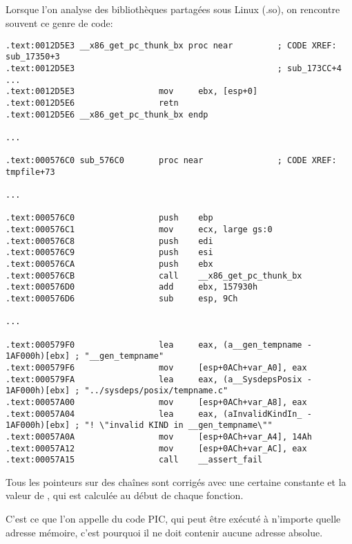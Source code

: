\subsection{\CapitalPICcode}
\myindex{\PICcode}
\label{sec:PIC}

Lorsque l'on analyse des bibliothèques partagées sous Linux (.so), on rencontre souvent
ce genre de code:

\begin{lstlisting}[caption=libc-2.17.so x86]
.text:0012D5E3 __x86_get_pc_thunk_bx proc near         ; CODE XREF: sub_17350+3
.text:0012D5E3                                         ; sub_173CC+4 ...
.text:0012D5E3                 mov     ebx, [esp+0]
.text:0012D5E6                 retn
.text:0012D5E6 __x86_get_pc_thunk_bx endp

...

.text:000576C0 sub_576C0       proc near               ; CODE XREF: tmpfile+73

...

.text:000576C0                 push    ebp
.text:000576C1                 mov     ecx, large gs:0
.text:000576C8                 push    edi
.text:000576C9                 push    esi
.text:000576CA                 push    ebx
.text:000576CB                 call    __x86_get_pc_thunk_bx
.text:000576D0                 add     ebx, 157930h
.text:000576D6                 sub     esp, 9Ch

...

.text:000579F0                 lea     eax, (a__gen_tempname - 1AF000h)[ebx] ; "__gen_tempname"
.text:000579F6                 mov     [esp+0ACh+var_A0], eax
.text:000579FA                 lea     eax, (a__SysdepsPosix - 1AF000h)[ebx] ; "../sysdeps/posix/tempname.c"
.text:00057A00                 mov     [esp+0ACh+var_A8], eax
.text:00057A04                 lea     eax, (aInvalidKindIn_ - 1AF000h)[ebx] ; "! \"invalid KIND in __gen_tempname\""
.text:00057A0A                 mov     [esp+0ACh+var_A4], 14Ah
.text:00057A12                 mov     [esp+0ACh+var_AC], eax
.text:00057A15                 call    __assert_fail
\end{lstlisting}


Tous les pointeurs sur des chaînes sont corrigés avec une certaine constante et la valeur de \EBX,
qui est calculée au début de chaque fonction.

C'est ce que l'on appelle du code \ac{PIC}, qui peut être exécuté à n'importe quelle adresse mémoire, c'est pourquoi il ne doit contenir aucune adresse absolue.

